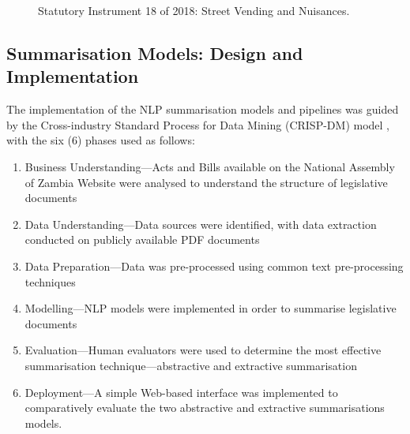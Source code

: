 \documentclass[conference]{IEEEtran}
\begin{document}
\begin{figure}%
%
\caption{Statutory Instrument 18 of 2018: Street Vending and Nuisances.}
\label{fig:methodology:understanding_legislation_documents:si18_2018}
\end{figure}

\subsection{Summarisation Models: Design and Implementation}
\label{sec:methodology:summarisation_models_implementaiton}
The implementation of the NLP summarisation models and pipelines was guided by the Cross-industry Standard Process for Data Mining (CRISP-DM) model \cite{Wirth2000CRISPDM}, with the six (6) phases used as follows:
\begin{enumerate}[label=\textbf{Phase \arabic*.}, leftmargin=*]
    \item Business Understanding---Acts and Bills available on the National Assembly of Zambia Website were analysed to understand the structure of legislative documents
    \item Data Understanding---Data sources were identified, with data extraction conducted on publicly available PDF documents
    \item Data Preparation---Data was pre-processed using common text pre-processing techniques
    \item Modelling---NLP models were implemented in order to summarise legislative documents
    \item Evaluation---Human evaluators were used to determine the most effective summarisation technique---abstractive and extractive summarisation
    \item Deployment---A simple Web-based interface was implemented to comparatively evaluate the two abstractive and extractive summarisations models.
\end{enumerate}
\end{document}
